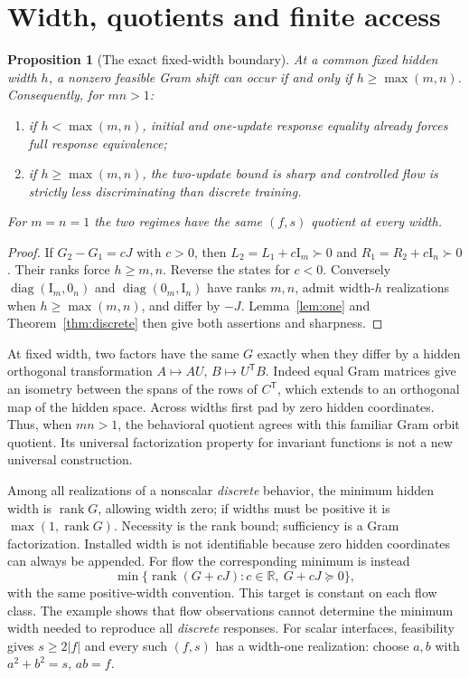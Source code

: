 \documentclass[11pt]{article}
\newtheorem{proposition}[theorem]{Proposition}
\theoremstyle{remark}\newtheorem{remark}[theorem]{Remark}
\newcommand{\R}{\mathbb R}
\newcommand{\Id}{\mathrm I}
\newcommand{\rank}{\operatorname{rank}}
\newcommand{\diag}{\operatorname{diag}}
\begin{document}
\section{Width, quotients and finite access}
\begin{proposition}[The exact fixed-width boundary]\label{prop:width}
At a common fixed hidden width $h$, a nonzero feasible Gram shift can
occur if and only if $h\geq\max(m,n)$. Consequently, for $mn>1$:
\begin{enumerate}[label=(\roman*)]
\item if $h<\max(m,n)$, initial and one-update response equality already
forces full response equivalence;
\item if $h\geq\max(m,n)$, the two-update bound is sharp and controlled
flow is strictly less discriminating than discrete training.
\end{enumerate}
For $m=n=1$ the two regimes have the same $(f,s)$ quotient at every width.
\end{proposition}
\begin{proof}
If $G_2-G_1=cJ$ with $c>0$, then
$L_2=L_1+c\Id_m\succ0$ and $R_1=R_2+c\Id_n\succ0$.
Their ranks force $h\geq m,n$. Reverse the states for $c<0$.
Conversely $\diag(\Id_m,0_n)$ and $\diag(0_m,\Id_n)$ have ranks
$m,n$, admit width-$h$ realizations when $h\geq\max(m,n)$, and differ
by $-J$. Lemma~\ref{lem:one} and Theorem~\ref{thm:discrete} then give
both assertions and sharpness.
\end{proof}

At fixed width, two factors have the same $G$ exactly when they differ
by a hidden orthogonal transformation
$A\mapsto AU$, $B\mapsto U^{\mathsf T}B$.
Indeed equal Gram matrices give an isometry between the spans of the
rows of $C^{\mathsf T}$, which extends to an orthogonal map of the hidden
space. Across widths first pad by zero hidden coordinates. Thus, when
$mn>1$, the behavioral quotient agrees with this familiar Gram orbit
quotient. Its universal factorization property for invariant functions
is not a new universal construction.

Among all realizations of a nonscalar \emph{discrete} behavior, the minimum
hidden width is $\rank G$, allowing width zero; if widths must be positive
it is $\max(1,\rank G)$. Necessity is the rank bound; sufficiency is a Gram
factorization. Installed width is not identifiable because zero hidden
coordinates can always be appended. For flow the corresponding minimum
is instead
\[
 \min\{\rank(G+cJ):c\in\R,\ G+cJ\succeq0\},
\]
with the same positive-width convention. This target is constant on each
flow class. The example shows that flow observations cannot determine
the minimum width needed to reproduce all \emph{discrete} responses.
For scalar interfaces, feasibility gives $s\geq2|f|$ and every such
$(f,s)$ has a width-one realization: choose $a,b$ with
$a^2+b^2=s$, $ab=f$.
\end{document}
